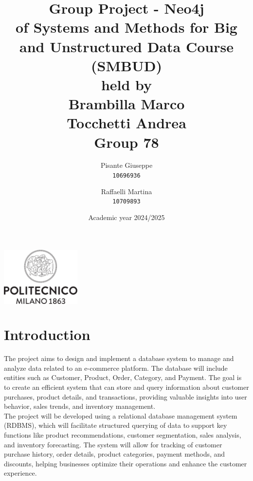 \documentclass[a4paper,12pt]{article}
\begin{document}
\title{%
  Group Project - Neo4j \\
  \large of Systems and Methods for Big
    and Unstructured Data Course \\(SMBUD)\\
    held by\\ Brambilla Marco\\ Tocchetti Andrea \\
  \vspace{5mm}
  \Large \textbf{Group 78}}
\author{Pisante Giuseppe\\
  \texttt{10696936}
  \and
  Raffaelli Martina\\
  \texttt{10709893}
}
\date{Academic year 2024/2025}
\maketitle
\begin{center}
  \includegraphics[width=4cm]{polilogo.png}\\
\end{center}
\newpage
\tableofcontents
\newpage
\section{Introduction}
\paragraph{} The project aims to design and implement a database system to manage and analyze data related to an e-commerce platform. The database will include entities such as Customer, Product, Order, Category, and Payment. The goal is to create an efficient system that can store and query information about customer purchases, product details, and transactions, providing valuable insights into user behavior, sales trends, and inventory management.
\\
The project will be developed using a relational database management system (RDBMS), which will facilitate structured querying of data to support key functions like product recommendations, customer segmentation, sales analysis, and inventory forecasting. The system will allow for tracking of customer purchase history, order details, product categories, payment methods, and discounts, helping businesses optimize their operations and enhance the customer experience.
\end{document}
